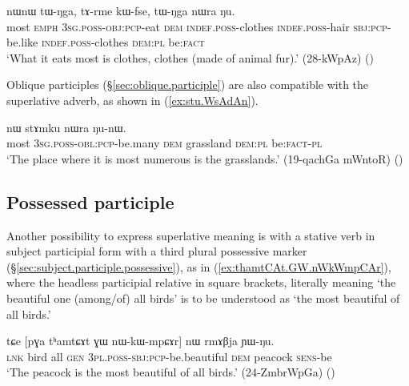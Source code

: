 \begin{exe}
\ex \label{ex:stu.Zo.WkAndza}
 nɯnɯ tɯ-ŋga, tɤ-rme kɯ-fse, tɯ-ŋga nɯra ŋu. \\
most \textsc{emph} \textsc{3sg}.\textsc{poss}-\textsc{obj}:\textsc{pcp}-eat \textsc{dem} \textsc{indef}.\textsc{poss}-clothes \textsc{indef}.\textsc{poss}-hair \textsc{sbj}:\textsc{pcp}-be.like \textsc{indef}.\textsc{poss}-clothes \textsc{dem}:\textsc{pl} be:\textsc{fact} \\
\glt `What it eats most is clothes, clothes (made of animal fur).' (28-kWpAz)
()
\end{exe}

Oblique participles (§\ref{sec:oblique.participle}) are also compatible with the superlative adverb, as shown in (\ref{ex:stu.WsAdAn}).

\begin{exe}
\ex \label{ex:stu.WsAdAn}
 nɯ stɤmku nɯra ŋu-nɯ.   \\
most \textsc{3sg}.\textsc{poss}-\textsc{obl}:\textsc{pcp}-be.many \textsc{dem} grassland \textsc{dem}:\textsc{pl} be:\textsc{fact}-\textsc{pl}  \\
\glt `The place where it is most numerous is the grasslands.' (19-qachGa mWntoR)
()
\end{exe}


 \subsection{Possessed participle} \label{sec:possessed.superlative}
Another possibility to express superlative meaning is with a stative verb in subject participial form with a third plural possessive marker (§\ref{sec:subject.participle.possessive}), as in (\ref{ex:thamtCAt.GW.nWkWmpCAr}), where the headless participial relative in square brackets, literally meaning `the beautiful one (among/of) all birds' is to be understood as `the most beautiful of all birds.' 

 \begin{exe} 
\ex \label{ex:thamtCAt.GW.nWkWmpCAr}
\gll tɕe [pɣa tʰamtɕɤt ɣɯ nɯ-kɯ-mpɕɤr] nɯ rmɤβja ɲɯ-ŋu.  \\
\textsc{lnk} bird all \textsc{gen} \textsc{3pl}.\textsc{poss}-\textsc{sbj}:\textsc{pcp}-be.beautiful \textsc{dem} peacock \textsc{sens}-be \\
\glt `The peacock is the most beautiful of all birds.' (24-ZmbrWpGa)
()
\end{exe}


